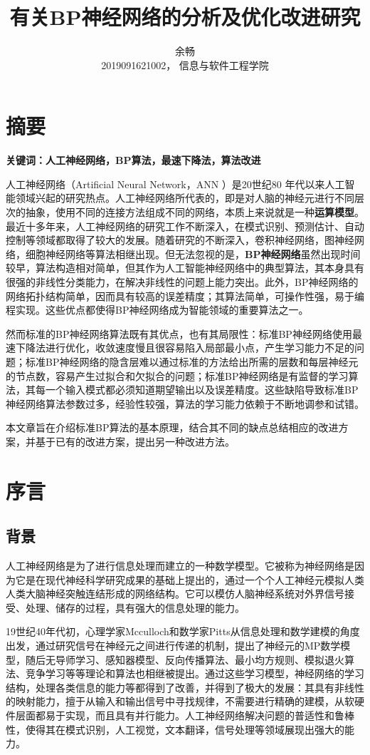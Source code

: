 \documentclass[UTF8]{ctexart}
\title{有关BP神经网络的分析及优化改进研究}
\author{余畅 \\ 2019091621002， 信息与软件工程学院}
\begin{document}
\maketitle

\section{摘要}
\textbf{关键词：人工神经网络，BP算法，最速下降法，算法改进} \par
人工神经网络（Artificial Neural Network，ANN ）是20世纪80 年代以来人工智能领域兴起的研究热点。人工神经网络所代表的，即是对人脑的神经元进行不同层次的抽象，使用不同的连接方法组成不同的网络，本质上来说就是一种\textbf{运算模型}。最近十多年来，人工神经网络的研究工作不断深入，在模式识别、预测估计、自动控制等领域都取得了较大的发展。随着研究的不断深入，卷积神经网络，图神经网络，细胞神经网络等算法相继出现。但无法忽视的是，\textbf{BP神经网络}虽然出现时间较早，算法构造相对简单，但其作为人工智能神经网络中的典型算法，其本身具有很强的非线性分类能力，在解决非线性的问题上能力突出。此外，BP神经网络的网络拓扑结构简单，因而具有较高的误差精度；其算法简单，可操作性强，易于编程实现。这些优点都使得BP神经网络成为智能领域的重要算法之一。 \par
然而标准的BP神经网络算法既有其优点，也有其局限性：标准BP神经网络使用最速下降法进行优化，收敛速度慢且很容易陷入局部最小点，产生学习能力不足的问题；标准BP神经网络的隐含层难以通过标准的方法给出所需的层数和每层神经元的节点数，容易产生过拟合和欠拟合的问题；标准BP神经网络是有监督的学习算法，其每一个输入模式都必须知道期望输出以及误差精度。这些缺陷导致标准BP神经网络算法参数过多，经验性较强，算法的学习能力依赖于不断地调参和试错。 \par
本文章旨在介绍标准BP算法的基本原理，结合其不同的缺点总结相应的改进方案，并基于已有的改进方案，提出另一种改进方法。

\section{序言}
\subsection{背景}
人工神经网络是为了进行信息处理而建立的一种数学模型。它被称为神经网络是因为它是在现代神经科学研究成果的基础上提出的，通过一个个人工神经元模拟人类人类大脑神经突触连结形成的网络结构。它可以模仿人脑神经系统对外界信号接受、处理、储存的过程，具有强大的信息处理的能力。 \par
19世纪40年代初，心理学家Mcculloch和数学家Pitts从信息处理和数学建模的角度出发，通过研究信号在神经元之间进行传递的机制，提出了神经元的MP数学模型，随后无导师学习、感知器模型、反向传播算法、最小均方规则、模拟退火算法、竞争学习等等理论和算法也相继被提出。通过这些学习模型，神经网络的学习结构，处理各类信息的能力等都得到了改善，并得到了极大的发展：其具有非线性的映射能力，擅于从输入和输出信号中寻找规律，不需要进行精确的建模，从软硬件层面都易于实现，而且具有并行能力。人工神经网络解决问题的普适性和鲁棒性，使得其在模式识别，人工视觉，文本翻译，信号处理等领域展现出强大的能力。 \par
\end{document}
